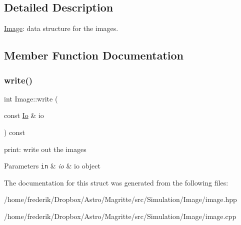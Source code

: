 \subsection{Detailed Description}
\mbox{\hyperlink{structImage}{Image}}\+: data structure for the images. 

\subsection{Member Function Documentation}
\mbox{\label{structImage_a9b3922e23578e6e8f5f471c327c1b250}} 
\subsubsection{\texorpdfstring{write()}{write()}}
{\footnotesize\ttfamily int Image\+::write (\begin{DoxyParamCaption}\item[{const \mbox{\hyperlink{structIo}{Io}} \&}]{io }\end{DoxyParamCaption}) const}

print\+: write out the images 
\begin{DoxyParams}[1]{Parameters}
\mbox{\tt in}  & {\em io} & io object \\
\hline
\end{DoxyParams}


The documentation for this struct was generated from the following files\+:\begin{DoxyCompactItemize}
\item 
/home/frederik/\+Dropbox/\+Astro/\+Magritte/src/\+Simulation/\+Image/image.\+hpp\item 
/home/frederik/\+Dropbox/\+Astro/\+Magritte/src/\+Simulation/\+Image/image.\+cpp\end{DoxyCompactItemize}
